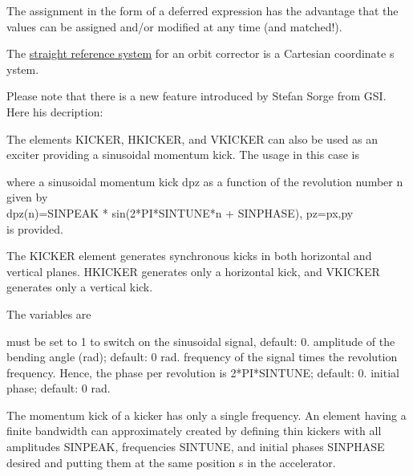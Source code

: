 The assignment in the form of a deferred expression has the advantage
that the values can be assigned and/or modified at any time (and
matched!).   

The \href{local_system.html#straight}{straight reference system} for an
orbit corrector is a Cartesian coordinate s ystem.  



Please note that there is a new feature introduced by Stefan Sorge from
GSI. Here his decription:

The elements KICKER, HKICKER, and VKICKER can also be used as  an
exciter providing a sinusoidal momentum kick. The usage in this case is   

where a sinusoidal momentum kick dpz as a function of the  revolution
number n given by\\   
dpz(n)=SINPEAK * sin(2*PI*SINTUNE*n + SINPHASE), pz=px,py \\ 
is provided. 

The KICKER element generates synchronous kicks in both horizontal and
vertical planes. HKICKER generates only a horizontal kick, and VKICKER
generates only a vertical kick.   

The variables are 

\begin{madlist}
    must be set to 1 to switch on the sinusoidal
     signal, default: 0.  
    amplitude of the bending angle (rad); default: 0
     rad.   
    frequency of the signal times the revolution
     frequency.  Hence, the phase per revolution is 2*PI*SINTUNE;
     default: 0.   
    initial phase; default: 0 rad.  
\end{madlist}

The momentum kick of a kicker has only a single frequency. An element
having a finite bandwidth can approximately created by defining  thin
kickers with all amplitudes SINPEAK, frequencies SINTUNE, and  initial
phases SINPHASE desired and putting them at the same position s in  the
accelerator.   



